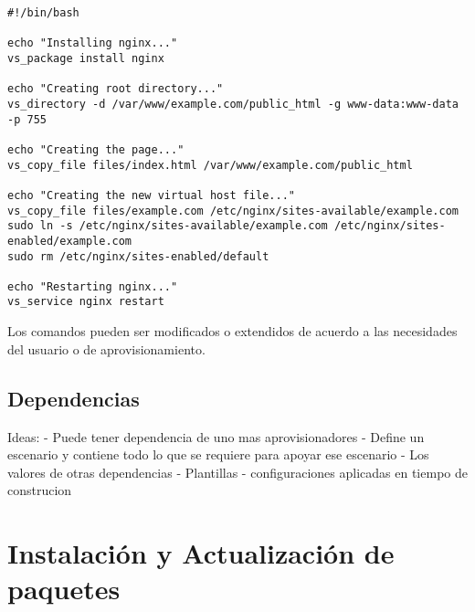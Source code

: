 \begin{lstlisting}[style=json, caption=Ejemplo de un script shell usando los comandos de VirtShell]
#!/bin/bash

echo "Installing nginx..."
vs_package install nginx

echo "Creating root directory..."
vs_directory -d /var/www/example.com/public_html -g www-data:www-data -p 755

echo "Creating the page..."
vs_copy_file files/index.html /var/www/example.com/public_html

echo "Creating the new virtual host file..."
vs_copy_file files/example.com /etc/nginx/sites-available/example.com
sudo ln -s /etc/nginx/sites-available/example.com /etc/nginx/sites-enabled/example.com
sudo rm /etc/nginx/sites-enabled/default

echo "Restarting nginx..."
vs_service nginx restart
\end{lstlisting}

\vspace{5mm}

Los comandos pueden ser modificados o extendidos de acuerdo a las necesidades del usuario o de aprovisionamiento.

\subsection{Dependencias}


Ideas:
- Puede tener dependencia de uno mas aprovisionadores
- Define un escenario y contiene todo lo que se requiere para apoyar ese escenario
  - Los valores de otras dependencias
  - Plantillas
- configuraciones aplicadas en tiempo de construcion



\section{Instalación y Actualización de paquetes}




